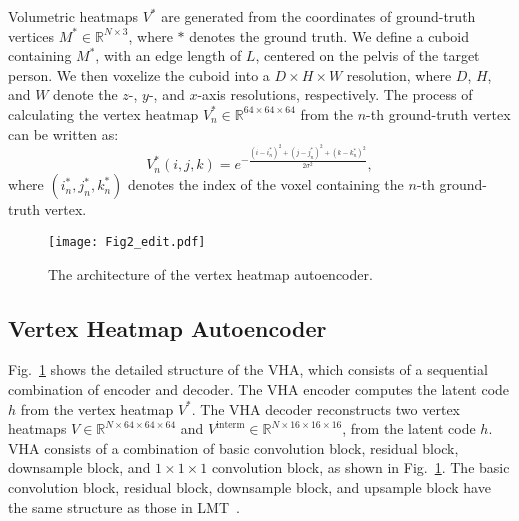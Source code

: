 \documentclass{article}
\begin{document}
Volumetric heatmaps $V^{*}$ are generated from the coordinates of ground-truth vertices $M^{*}\in{}\mathbb{R}^{N\times{}3}$, where $*$ denotes the ground truth. We define a cuboid containing $M^{*}$, with an edge length of $L$, centered on the pelvis of the target person. We then voxelize the cuboid into a $D\times{}H\times{}W$ resolution, where $D$, $H$, and $W$ denote the $z$-, $y$-, and $x$-axis resolutions, respectively. The process of calculating the vertex heatmap $V_{n}^{*}\in{}\mathbb{R}^{64\times{}64\times{}64}$ from the $n$-th ground-truth vertex can be written as:
\begin{equation}
\label{eq:volumetric_heatmap}
    V_n^{*}(i,j,k)=e^{-\frac{(i-i_{n}^{*})^2+(j-j_{n}^{*})^2+(k-k_{n}^{*})^2}{2\sigma^{2}}},
\end{equation}
where $(i_{n}^{*},j_{n}^{*},k_{n}^{*})$ denotes the index of the voxel containing the $n$-th ground-truth vertex.

\begin{figure}[t]
\centering
\texttt{[image: Fig2\_edit.pdf]}
\caption{The architecture of the vertex heatmap autoencoder.}
\label{fig:vha}
\end{figure}


\subsection{Vertex Heatmap Autoencoder}
\label{ssec:vha}

Fig.~\ref{fig:vha} shows the detailed structure of the VHA, which consists of a sequential combination of encoder and decoder. The VHA encoder computes the latent code $h$ from the vertex heatmap $V^{*}$. The VHA decoder reconstructs two vertex heatmaps $V\in{}\mathbb{R}^{N\times{}64\times{}64\times{}64}$ and $V^{\text{interm}}\in{}\mathbb{R}^{N\times{}16\times{}16\times{}16}$, from the latent code $h$. VHA consists of a combination of basic convolution block, residual block, downsample block, and $1\times{}1\times{}1$ convolution block, as shown in Fig.~\ref{fig:vha}. The basic convolution block, residual block, downsample block, and upsample block have the same structure as those in LMT~\cite{Chun_2023_WACV}.
\end{document}

